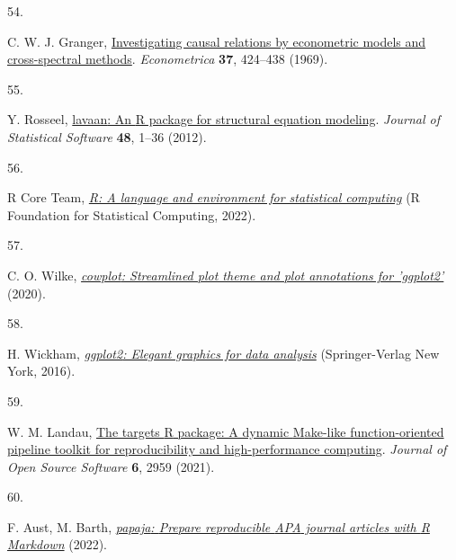 \documentclass[
  man, donotrepeattitle,floatsintext]{apa6}
\newlength{\cslhangindent}
\newlength{\csllabelwidth}
\newlength{\cslentryspacingunit} %
\newenvironment{CSLReferences}[2] %
 {%
  \setlength{\parindent}{0pt}
  \ifodd #1
  \let\oldpar\par
  \def\par{\hangindent=\cslhangindent\oldpar}
  \fi
  \setlength{\parskip}{#2\cslentryspacingunit}
 }%
 {}
\newcommand{\CSLLeftMargin}[1]{\parbox[t]{\csllabelwidth}{#1}}
\newcommand{\CSLRightInline}[1]{\parbox[t]{\linewidth - \csllabelwidth}{#1}\break}
\begin{document}
\begin{CSLReferences}{0}{0}
\leavevmode{}%
\CSLLeftMargin{54. }%
\CSLRightInline{C. W. J. Granger, \href{https://doi.org/10.2307/1912791}{Investigating causal relations by econometric models and cross-spectral methods}. \emph{Econometrica} \textbf{37}, 424--438 (1969).}

\leavevmode{}%
\CSLLeftMargin{55. }%
\CSLRightInline{Y. Rosseel, \href{https://doi.org/10.18637/jss.v048.i02}{{lavaan}: An {R} package for structural equation modeling}. \emph{Journal of Statistical Software} \textbf{48}, 1--36 (2012).}

\leavevmode{}%
\CSLLeftMargin{56. }%
\CSLRightInline{R Core Team, \emph{\href{https://www.R-project.org/}{R: A language and environment for statistical computing}} (R Foundation for Statistical Computing, 2022).}

\leavevmode{}%
\CSLLeftMargin{57. }%
\CSLRightInline{C. O. Wilke, \emph{\href{https://CRAN.R-project.org/package=cowplot}{{cowplot}: Streamlined plot theme and plot annotations for 'ggplot2'}} (2020).}

\leavevmode{}%
\CSLLeftMargin{58. }%
\CSLRightInline{H. Wickham, \emph{\href{https://ggplot2.tidyverse.org}{{ggplot2}: Elegant graphics for data analysis}} (Springer-Verlag New York, 2016).}

\leavevmode{}%
\CSLLeftMargin{59. }%
\CSLRightInline{W. M. Landau, \href{https://doi.org/10.21105/joss.02959}{The targets {R} package: A dynamic {M}ake-like function-oriented pipeline toolkit for reproducibility and high-performance computing}. \emph{Journal of Open Source Software} \textbf{6}, 2959 (2021).}

\leavevmode{}%
\CSLLeftMargin{60. }%
\CSLRightInline{F. Aust, M. Barth, \emph{\href{https://github.com/crsh/papaja}{{papaja}: {Prepare} reproducible {APA} journal articles with {R Markdown}}} (2022).}

\end{CSLReferences}

\endgroup

\newpage

\hypertarget{appendix-appendix}{%
\appendix}


\renewcommand{\appendixname}{\textbf{Supplementary Material}}
\renewcommand{\thefigure}{S\arabic{figure}} \setcounter{figure}{0}
\renewcommand{\thetable}{S\arabic{table}} \setcounter{table}{0}
\renewcommand{\theequation}{S\arabic{table}} \setcounter{equation}{0}
\end{document}

